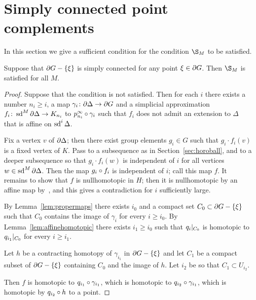 \documentclass[a4paper]{article}
\begin{document}
\section{Simply connected point complements}

In this section we give a sufficient condition for the condition $\S_M$ to be
satisfied.

\begin{proposition}
  Suppose that $\partial G - \left\{\xi\right\}$ is simply connected for any point $\xi
  \in \partial G$. Then $\S_M$ is satisfied for all $M$.
\end{proposition}

\begin{proof}
  Suppose that the condition is not satisfied. Then for each $i$ there exists a
  number $n_i \geq i$, a map $\gamma_i \colon \partial\Delta \to \partial G$
  and a simplicial approximation $f_i \colon \operatorname{sd}^M \partial\Delta \to K_{n_i}$
  to $p^\infty_{n_i}\circ\gamma_i$ such that $f_i$ does not admit an
  extension to $\Delta$ that is affine on $\operatorname{sd}^i\Delta$.

  Fix a vertex $v$ of $\partial\Delta$; then there exist group elements $g_i
  \in G$ such that $g_i\cdot f_i(v)$ is a fixed vertex of $K$. Pass to a
  subsequence as in Section~\ref{sec:horoball}, and to a deeper subsequence so
  that $g_i\cdot f_i(w)$ is independent of $i$ for all vertices $w \in \operatorname{sd}^M
  \partial\Delta$. Then the map $g_i\circ f_i$ is independent of $i$; call
  this map $f$. It remains to show that $f$ is nullhomotopic in $H$; then it is
  nullhomotopic by an affine map by~\cite{zeeman64}, and this gives a
  contradiction for $i$ sufficiently large.

  By Lemma~\ref{lem:propermaps} there exists $i_0$ and a 
  compact set $C_0 \subset \partial G - \left\{\xi\right\}$ such that $C_0$ contains the
  image of $\gamma_i$ for every $i \geq i_0$. By
  Lemma~\ref{lem:affinehomotopic} there exists $i_1 \geq i_0$ such that
  $q_i\vert_{C_0}$ is homotopic to $q_{i_1}\vert_{C_0}$ for every $i
  \geq i_1$.  
  
  Let $h$ be a contracting homotopy of $\gamma_{i_1}$ in $\partial G -
  \left\{\xi\right\}$ and let $C_1$ be a compact subset of $\partial G - \left\{\xi\right\}$
  containing $C_0$ and the image of $h$. Let $i_2$ be so that $C_1 \subset
  U_{i_2}$.

  Then $f$ is homotopic to $q_{i_1}\circ\gamma_{i_1}$, which is homotopic
  to $q_{i_2}\circ\gamma_{i_1}$, which is homotopic by $q_{i_2}\circ h$
  to a point.
\end{proof}


\end{document}
